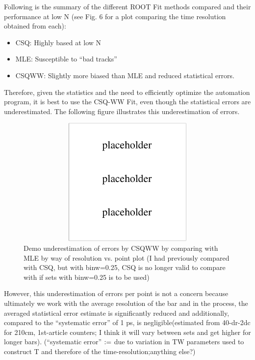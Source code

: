 \documentclass[12pt]{article}
\newcommand{\defeq}{\vcentcolon=}
\begin{document}
\clearpage

Following is the summary of the different ROOT Fit methods compared and their performance at low N (see Fig. 6 for a plot comparing the time resolution obtained from each):

\begin{itemize}
	\item CSQ: Highly based at low N
	\item MLE: Susceptible to ``bad tracks''
	\item CSQWW: Slightly more biased than MLE and reduced statistical errors. 
\end{itemize}

Therefore, given the statistics and the need to efficiently optimize the automation program, it is best to use the CSQ-WW Fit, even though the statistical errors are underestimated. The following figure illustrates this underestimation of errors.

\begin{figure}[ht]
	\includegraphics[height=2.5in,width=5.5in]{placeholder.pdf}
	\caption{Demo underestimation of errors by CSQWW by comparing with MLE by way of resolution vs. point plot (I had previously compared with CSQ, but with binw=0.25, CSQ is no longer valid to compare with if sets with binw=0.25 is to be used) }
	\label{fig4}
\end{figure}

However, this underestimation of errors per point is not a concern because ultimately we work with the average resolution of the bar and in the process, the averaged statistical error estimate is significantly reduced and additionally, compared to the ``systematic error'' of 1 ps, is negligible(estimated from 40-dr-2dc for 210cm, 1st-article counters; I think it will vary between sets and get higher for longer bars). (``systematic error'' $\defeq$ due to variation in TW parameters used to construct T and therefore of the time-resolution;anything else?)
\end{document}

